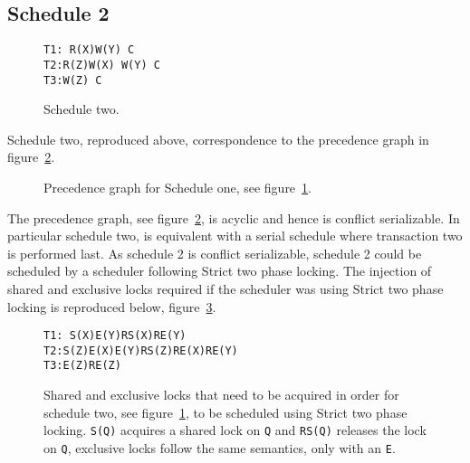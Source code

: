 \documentclass[12pt]{article}
\begin{document}
\subsection*{Schedule 2} 
\begin{figure}[h!]
\texttt{T1: R(X)\hspace{150pt}W(Y) C\\
T2:\hspace{130pt}R(Z)\hspace{120pt}W(X) W(Y) C\\
T3:\hspace{50pt}W(Z) C}
\caption{Schedule two.}
\label{sch2}
\end{figure}
Schedule two, reproduced above, correspondence to the precedence graph in figure~\ref{p2}.
\begin{figure}[h!]
\centering
{}
\caption{Precedence graph for Schedule one, see figure~\ref{sch2}.}
\label{p2}
\end{figure}
The precedence graph, see figure~\ref{p2}, is acyclic and hence is conflict serializable. In particular schedule two, is equivalent with a serial schedule where transaction two is performed last. As schedule 2 is conflict serializable, schedule 2 could be scheduled by a scheduler following Strict two phase locking. The injection of shared and exclusive locks required if the scheduler was using Strict two phase locking is reproduced below, figure~\ref{locks}.
\begin{figure}[h!]
\texttt{T1: S(X)\hspace{95pt}E(Y)RS(X)RE(Y)\\
T2:\hspace{105pt}S(Z)\hspace{90pt}E(X)E(Y)RS(Z)RE(X)RE(Y)\\
T3:\hspace{50pt}E(Z)RE(Z)}
\label{locks}
\caption{Shared and exclusive locks that need to be acquired in order for schedule two, see figure~\ref{sch2}, to be scheduled using Strict two phase locking. \texttt{S(Q)} acquires a shared lock on \texttt{Q} and \texttt{RS(Q)} releases the lock on \texttt{Q}, exclusive locks follow the same semantics, only with an \texttt{E}.}
\end{figure}
\end{document}
